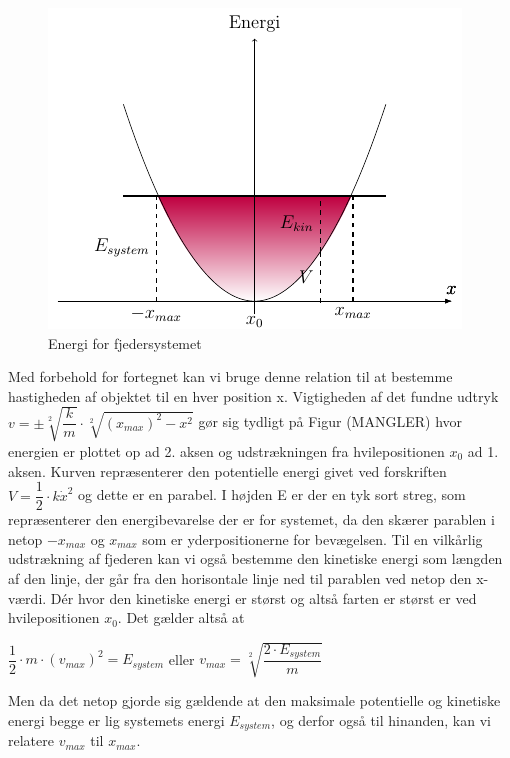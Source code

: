 \begin{figure}
\begin{center}
\includegraphics[scale=0.8]{Billeder/parabel}
\end{center}
\caption{Energi for fjedersystemet \label{fig:parabel}}
\end{figure} 

Med forbehold for fortegnet kan vi bruge denne relation til at bestemme hastigheden af objektet til en hver position x. Vigtigheden af det fundne udtryk $v = \pm \sqrt[2]{\dfrac{k}{m}} \cdot \sqrt[2]{(x_{max})^2-x^2}$ gør sig tydligt på Figur (MANGLER) hvor energien er plottet op ad 2. aksen og udstrækningen fra hvilepositionen $x_0$ ad 1. aksen. Kurven repræsenterer den potentielle energi givet ved forskriften $V=\dfrac{1}{2} \cdot k \dot x^2$ og dette er en parabel. I højden E er der en tyk sort streg, som repræsenterer den energibevarelse der er for systemet, da den skærer parablen i netop $-x_{max}$ og $x_{max}$ som er yderpositionerne for bevægelsen. Til en vilkårlig udstrækning af fjederen kan vi også bestemme den kinetiske energi som længden af den linje, der går fra den horisontale linje ned til parablen ved netop den x-værdi. Dér hvor den kinetiske energi er størst og altså farten er størst er ved hvilepositionen $x_0$. Det gælder altså at

\bigskip
\begin{center}
$\dfrac{1}{2} \cdot m \cdot (v_{max})^2 = E_{system}$ eller $v_{max} = \sqrt[2]{\dfrac{2 \cdot E_{system}}{m}}$
\end{center}
\bigskip

Men da det netop gjorde sig gældende at den maksimale potentielle og kinetiske energi begge er lig systemets energi $E_{system}$, og derfor også til hinanden, kan vi relatere $v_{max}$ til $x_{max}$.


